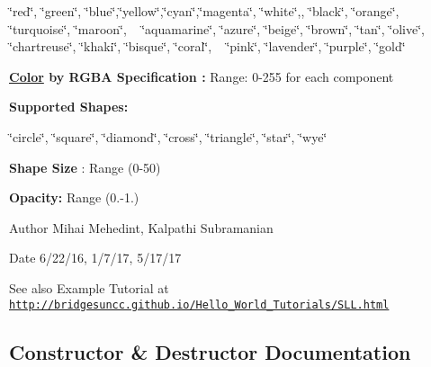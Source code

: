 \char`\"{}red\char`\"{}, \char`\"{}green\char`\"{}, \char`\"{}blue\char`\"{},\char`\"{}yellow\char`\"{},\char`\"{}cyan\char`\"{},\char`\"{}magenta\char`\"{}, \char`\"{}white\char`\"{},, \char`\"{}black\char`\"{}, \char`\"{}orange\char`\"{}, \char`\"{}turquoise\char`\"{}, \char`\"{}maroon\char`\"{}, ~\newline
 \char`\"{}aquamarine\char`\"{}, \char`\"{}azure\char`\"{}, \char`\"{}beige\char`\"{}, \char`\"{}brown\char`\"{}, \char`\"{}tan\char`\"{}, \char`\"{}olive\char`\"{}, \char`\"{}chartreuse\char`\"{}, \char`\"{}khaki\char`\"{}, \char`\"{}bisque\char`\"{}, \char`\"{}coral\char`\"{}, ~\newline
 \char`\"{}pink\char`\"{}, \char`\"{}lavender\char`\"{}, \char`\"{}purple\char`\"{}, \char`\"{}gold\char`\"{} 

{\bfseries  \mbox{\hyperlink{classbridges_1_1base_1_1_color}{Color}} by R\+G\+BA Specification \+:} Range\+: 0-\/255 for each component 

{\bfseries Supported Shapes\+: }

\char`\"{}circle\char`\"{}, \char`\"{}square\char`\"{}, \char`\"{}diamond\char`\"{}, \char`\"{}cross\char`\"{}, \char`\"{}triangle\char`\"{}, \char`\"{}star\char`\"{}, \char`\"{}wye\char`\"{} 

{\bfseries  Shape Size} \+: Range (0-\/50) 

{\bfseries  Opacity\+: } Range (0.-\/1.) 

\begin{DoxyAuthor}{Author}
Mihai Mehedint, Kalpathi Subramanian
\end{DoxyAuthor}
\begin{DoxyDate}{Date}
6/22/16, 1/7/17, 5/17/17
\end{DoxyDate}
\begin{DoxySeeAlso}{See also}
Example Tutorial at ~\newline
 \href{http://bridgesuncc.github.io/Hello_World_Tutorials/SLL.html}{\tt http\+://bridgesuncc.\+github.\+io/\+Hello\+\_\+\+World\+\_\+\+Tutorials/\+S\+L\+L.\+html} 
\end{DoxySeeAlso}


\subsection{Constructor \& Destructor Documentation}
\mbox{\label{classbridges_1_1base_1_1_element_visualizer_acbca874876ec1e8dbbde6484a4fc056e}} 
